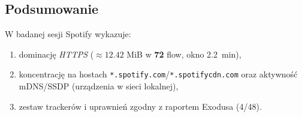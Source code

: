 \subsection{Podsumowanie}
W badanej sesji Spotify wykazuje:
\begin{enumerate}
\item dominację \emph{HTTPS} ($\approx 12.42$ MiB w \textbf{72} flow, okno \SI{2.2}{\minute}),
\item koncentrację na hostach \texttt{*.spotify.com}/\texttt{*.spotifycdn.com} oraz aktywność mDNS/SSDP (urządzenia w sieci lokalnej),
\item zestaw trackerów i uprawnień zgodny z raportem Exodusa (4/48).
\end{enumerate}
